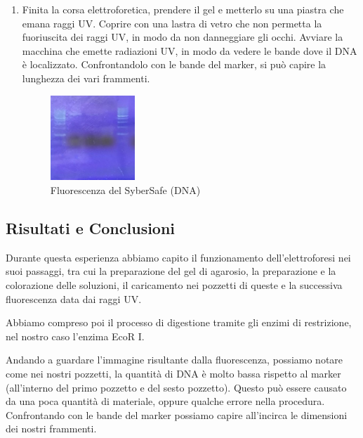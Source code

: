 \begin{enumerate}
	\item Finita la corsa elettroforetica, prendere il gel e metterlo su una piastra
	che emana raggi UV. Coprire con una lastra di vetro che non permetta la fuoriuscita dei raggi UV,
	in modo da non danneggiare gli occhi.
	Avviare la macchina che emette radiazioni UV, in modo da vedere le bande dove il DNA \`e localizzato.
	Confrontandolo con le bande del marker, si pu\`o capire la lunghezza dei vari frammenti.

	\begin{figure}[H]

		\centering
		\includegraphics[width=0.3\textwidth]{./immagini/uv.jpg}
		\caption{Fluorescenza del SyberSafe (DNA)}
		\label{SyberSafe}

	\end{figure}



\end{enumerate}


\subsection{Risultati e Conclusioni}

Durante questa esperienza abbiamo capito il funzionamento dell'elettroforesi nei suoi passaggi,
tra cui la preparazione del gel di agarosio, la preparazione e la colorazione delle soluzioni,
il caricamento nei pozzetti di queste e la successiva fluorescenza data dai raggi UV.

Abbiamo compreso poi il processo di digestione tramite gli enzimi di restrizione,
nel nostro caso l'enzima EcoR I.

Andando a guardare l'immagine risultante dalla fluorescenza,
possiamo notare come nei nostri pozzetti,
la quantità di DNA è molto bassa rispetto al
marker (all'interno del primo pozzetto e del sesto pozzetto).
Questo può essere causato da una poca quantità di materiale, oppure qualche errore nella procedura.
Confrontando con le bande del marker possiamo capire all'incirca le dimensioni dei nostri frammenti.
